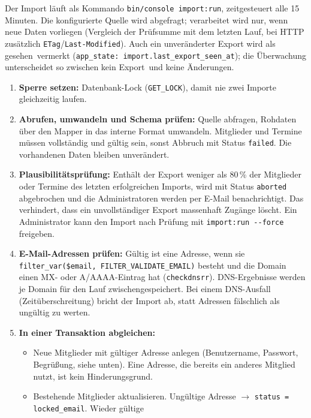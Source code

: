 \documentclass[a4paper,fontsize=10pt]{scrartcl}
\newcommand{\code}[1]{\texttt{#1}}
\begin{document}
Der Import läuft als Kommando \code{bin/console import:run}, zeitgesteuert
alle 15 Minuten. Die konfigurierte Quelle wird abgefragt; verarbeitet wird
nur, wenn neue Daten vorliegen (Vergleich der Prüfsumme mit dem letzten
Lauf, bei HTTP zusätzlich \code{ETag}/\code{Last-Modified}). Auch ein
unveränderter Export wird als \glqq gesehen\grqq\ vermerkt
(\code{app\_state: import.last\_export\_seen\_at}); die Überwachung
unterscheidet so zwischen \glqq kein Export\grqq\ und \glqq keine
Änderungen\grqq.

\begin{enumerate}
  \item \textbf{Sperre setzen:} Datenbank-Lock (\code{GET\_LOCK}), damit nie
        zwei Importe gleichzeitig laufen.
  \item \textbf{Abrufen, umwandeln und Schema prüfen:} Quelle abfragen,
        Rohdaten über den Mapper in das interne Format umwandeln. Mitglieder
        und Termine müssen vollständig und gültig sein, sonst Abbruch mit
        Status \code{failed}. Die
        vorhandenen Daten bleiben unverändert.
  \item \textbf{Plausibilitätsprüfung:} Enthält der Export weniger als 80\,\%
        der Mitglieder oder Termine des letzten erfolgreichen Imports, wird
        mit Status \code{aborted} abgebrochen und die Administratoren
        werden per E-Mail benachrichtigt. Das verhindert, dass ein
        unvollständiger Export massenhaft Zugänge löscht. Ein Administrator
        kann den Import nach Prüfung mit \code{import:run -{}-force}
        freigeben.
  \item \textbf{E-Mail-Adressen prüfen:} Gültig ist eine Adresse, wenn sie
        \code{filter\_var(\$email, FILTER\_VALIDATE\_EMAIL)} besteht und
        die Domain einen MX- oder A/AAAA-Eintrag hat
        (\code{checkdnsrr}). DNS-Ergebnisse werden je Domain für den Lauf
        zwischengespeichert. Bei einem DNS-Ausfall (Zeitüberschreitung)
        bricht der Import ab, statt Adressen fälschlich als ungültig zu
        werten.
  \item \textbf{In einer Transaktion abgleichen:}
    \begin{itemize}
      \item Neue Mitglieder mit gültiger Adresse anlegen
            (Benutzername, Passwort, Begrüßung, siehe unten). Eine Adresse,
            die bereits ein anderes Mitglied nutzt, ist kein Hinderungsgrund.
      \item Bestehende Mitglieder aktualisieren. Ungültige Adresse
            $\rightarrow$ \code{status = locked\_email}. Wieder gültige

\end{itemize}
\end{enumerate}
\end{document}
